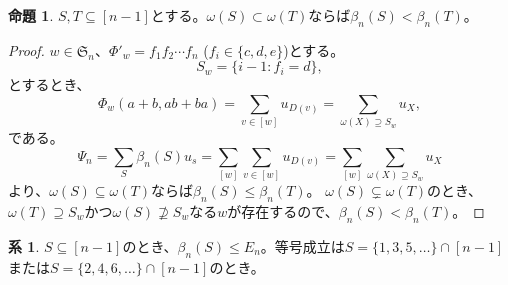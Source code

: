 \documentclass[xelatex,ja=standard,a4paper,14pt,everyparhook=compat]{bxjsarticle}
\newcommand{\fS}{\mathfrak{S}}
\theoremstyle{definition}
\newtheorem{proposition}[theorem]{命題}
\newtheorem{corollary}[theorem]{系}
\begin{document}
\begin{proposition}
    $S, T \subseteq [n-1]$とする。$\omega(S) \subset \omega(T)$ならば$\beta_n(S) < \beta_n(T)$。
\end{proposition}
\begin{proof}
    $w \in \fS_n$、$\Phi'_w = f_1 f_2 \cdots f_n$ ($f_i \in \{c,d,e\}$)とする。 \begin{equation*}
        S_w = \{i-1 : f_i = d\},
    \end{equation*}
    とするとき、 \begin{equation*}
        \Phi_w(a+b, ab+ba) = \sum_{v \in [w]} u_{D(v)} = \sum_{\omega(X) \supseteq S_w} u_X,
    \end{equation*}
    である。 \begin{equation*}
        \Psi_n = \sum_{S} \beta_n(S) u_s = \sum_{[w]}\sum_{v \in [w]} u_{D(v)} = \sum_{[w]} \sum_{\omega(X) \supseteq S_w} u_X
    \end{equation*}
    より、$\omega(S) \subseteq \omega(T)$ならば$\beta_n(S) \leq \beta_n(T)$。 $\omega(S) \subsetneq \omega(T)$のとき、$\omega(T) \supseteq S_w$かつ$\omega(S) \not\supseteq S_w$なる$w$が存在するので、$\beta_n(S) < \beta_n(T)$。
\end{proof}

\begin{corollary}
    $S \subseteq [n-1]$のとき、$\beta_n(S) \leq E_n$。等号成立は$S=\{1,3,5,\ldots\} \cap [n-1]$または$S=\{2,4,6,\ldots\} \cap [n-1]$のとき。
\end{corollary}
\end{document}
